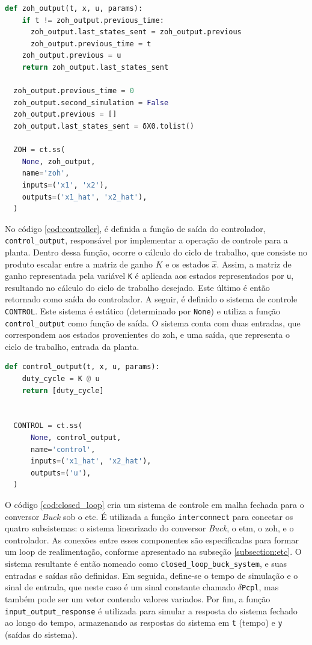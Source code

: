 \vspace{8pt}
\begin{lstlisting}[language=Python, caption={Implementação do \acrshort{zoh}}, label=cod:zoh]
  def zoh_output(t, x, u, params):
    if t != zoh_output.previous_time:
      zoh_output.last_states_sent = zoh_output.previous
      zoh_output.previous_time = t
    zoh_output.previous = u
    return zoh_output.last_states_sent

  zoh_output.previous_time = 0
  zoh_output.second_simulation = False
  zoh_output.previous = []
  zoh_output.last_states_sent = δX0.tolist()

  ZOH = ct.ss(
    None, zoh_output,
    name='zoh',
    inputs=('x1', 'x2'),
    outputs=('x1_hat', 'x2_hat'),
  )
\end{lstlisting}

No código \ref{cod:controller}, é definida a função de saída do controlador, \texttt{control\_output}, responsável por implementar a operação de controle para a planta. Dentro dessa função, ocorre o cálculo do ciclo de trabalho, que consiste no produto escalar entre a matriz de ganho $K$ e os estados $\hat{x}$. Assim, a matriz de ganho representada pela variável \texttt{K} é aplicada aos estados representados por \texttt{u}, resultando no cálculo do ciclo de trabalho desejado. Este último é então retornado como saída do controlador. A seguir, é definido o sistema de controle \texttt{CONTROL}. Este sistema é estático (determinado por \texttt{None}) e utiliza a função \texttt{control\_output} como função de saída. O sistema conta com duas entradas, que correspondem aos estados provenientes do \acrshort{zoh}, e uma saída, que representa o ciclo de trabalho, entrada da planta.

\vspace{8pt}
\begin{lstlisting}[language=Python, caption={Implementação do controlador.}, label=cod:controller]
  def control_output(t, x, u, params):
    duty_cycle = K @ u
    return [duty_cycle]


  CONTROL = ct.ss(
      None, control_output,
      name='control',
      inputs=('x1_hat', 'x2_hat'),
      outputs=('u'),
  )
\end{lstlisting}

O código \ref{cod:closed_loop} cria um sistema de controle em malha fechada para o conversor \textit{Buck} sob o \acrshort{etc}. É utilizada a função \texttt{interconnect} para conectar os quatro subsistemas: o sistema linearizado do conversor \textit{Buck}, o \acrshort{etm}, o \acrshort{zoh}, e o controlador. As conexões entre esses componentes são especificadas para formar um loop de realimentação, conforme apresentado na subseção \ref{subsection:etc}. O sistema resultante é então nomeado como \texttt{closed\_loop\_buck\_system}, e suas entradas e saídas são definidas. Em seguida, define-se o tempo de simulação e o sinal de entrada, que neste caso é um sinal constante chamado \texttt{\ensuremath{\delta}Pcpl}, mas também pode ser um vetor contendo valores variados. Por fim, a função \texttt{input\_output\_response} é utilizada para simular a resposta do sistema fechado ao longo do tempo, armazenando as respostas do sistema em \texttt{t} (tempo) e \texttt{y} (saídas do sistema).

